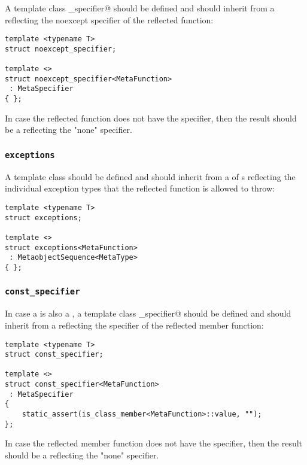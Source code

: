 A template class \verb@noexcept_specifier@ should be defined and should inherit from
a  reflecting the noexcept specifier of the reflected function:

\begin{verbatim}
template <typename T>
struct noexcept_specifier;

template <>
struct noexcept_specifier<MetaFunction>
 : MetaSpecifier
{ };
\end{verbatim}

In case the reflected function does not have the \verb@noexcept@ specifier,
then the result should be a  reflecting the "none" specifier.

\subsubsection{\texttt{exceptions}}

A template class \verb@exceptions@ should be defined and should inherit from
a  of s reflecting the individual exception types
that the reflected function is allowed to throw:

\begin{verbatim}
template <typename T>
struct exceptions;

template <>
struct exceptions<MetaFunction>
 : MetaobjectSequence<MetaType>
{ };
\end{verbatim}

\subsubsection{\texttt{const\_specifier}}

In case a  is also a ,
a template class \verb@const_specifier@ should be defined and should inherit from
a  reflecting the \verb@const@ specifier of the reflected member function:

\begin{verbatim}
template <typename T>
struct const_specifier;

template <>
struct const_specifier<MetaFunction>
 : MetaSpecifier
{
	static_assert(is_class_member<MetaFunction>::value, "");
};
\end{verbatim}

In case the reflected member function does not have the \verb@const@ specifier,
then the result should be a  reflecting the "none" specifier.

